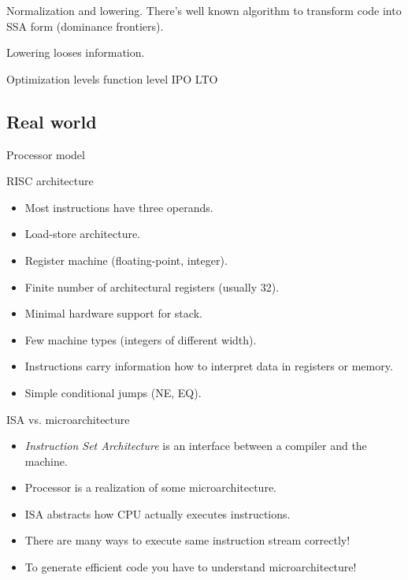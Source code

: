 \documentclass[8pt]{beamer}
\begin{document}
\begin{frame}{Normalization and lowering.}
  There's well known algorithm to transform code into SSA form (dominance frontiers).

  Lowering looses information.
\end{frame}

\begin{frame}{Optimization levels}
  function level
  IPO
  LTO
\end{frame}

\subsection*{Real world}

\begin{frame}{Processor model}
  \begin{block}{RISC architecture}
    \begin{itemize}
      \item Most instructions have three operands.
      \item Load-store architecture.
      \item Register machine (floating-point, integer).
      \item Finite number of architectural registers (usually 32).
      \item Minimal hardware support for stack.
      \item Few machine types (integers of different width).
      \item Instructions carry information how to interpret data in registers or memory.
      \item Simple conditional jumps (NE, EQ).
    \end{itemize}
  \end{block}

  \begin{block}{ISA vs. microarchitecture}
    \begin{itemize}
      \item \textit{Instruction Set Architecture} is an interface between a compiler and the machine.
      \item Processor is a realization of some microarchitecture.
      \item ISA abstracts how CPU actually executes instructions.
      \item There are many ways to execute same instruction stream correctly!
      \item To generate efficient code you have to understand microarchitecture!
    \end{itemize}
  \end{block}
\end{frame}
\end{document}

